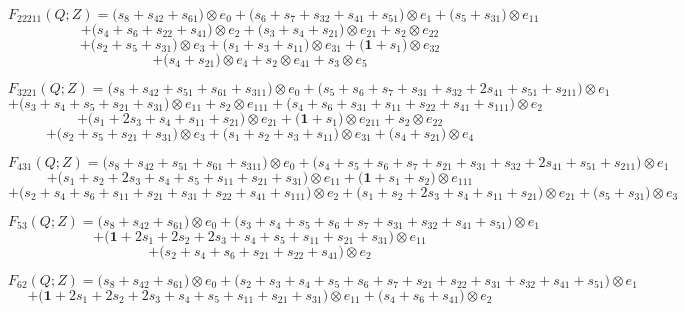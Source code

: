 \documentclass[12pt]{amsart}
\theoremstyle{plain}
\theoremstyle{definition}
\theoremstyle{remark}
\begin{document}
$$F_{ 22211 }(Q;Z)=
\big( s_{8} + s_{42} + s_{61} \big) \otimes e_{ 0 }
+\big( s_{6} + s_{7} + s_{32} + s_{41} + s_{51} \big) \otimes e_{ 1 }
+\big( s_{5} + s_{31} \big) \otimes e_{ 11 } $$ $$
+\big( s_{4} + s_{6} + s_{22} + s_{41} \big) \otimes e_{ 2 }
+\big( s_{3} + s_{4} + s_{21} \big) \otimes e_{ 21 }
+ s_{2} \otimes e_{ 22 } $$ $$
+\big( s_{2} + s_{5} + s_{31} \big) \otimes e_{ 3 }
+\big( s_{1} + s_{3} + s_{11} \big) \otimes e_{ 31 }
+\big( \boldsymbol{1} + s_{1} \big) \otimes e_{ 32 } $$ $$
+\big( s_{4} + s_{21} \big) \otimes e_{ 4 }
+ s_{2} \otimes e_{ 41 }
+ s_{3} \otimes e_{ 5 }
$$

\vfill\eject
$$F_{ 3221 }(Q;Z)=
\big( s_{8} + s_{42} + s_{51} + s_{61} + s_{311} \big) \otimes e_{ 0 }
+\big( s_{5} + s_{6} + s_{7} + s_{31} + s_{32} + 2 s_{41} + s_{51} + s_{211} \big) \otimes e_{ 1 } $$ $$
+\big( s_{3} + s_{4} + s_{5} + s_{21} + s_{31} \big) \otimes e_{ 11 } 
+ s_{2} \otimes e_{ 111 }
+\big( s_{4} + s_{6} + s_{31} + s_{11} + s_{22} + s_{41} + s_{111} \big) \otimes e_{ 2 } $$ $$
+\big( s_{1} + 2 s_{3} + s_{4} + s_{11} + s_{21} \big) \otimes e_{ 21 }
+\big( \boldsymbol{1} + s_{1} \big) \otimes e_{ 211 } 
+ s_{2} \otimes e_{ 22 } $$ $$
+\big( s_{2} + s_{5} + s_{21} + s_{31} \big) \otimes e_{ 3 }
+\big( s_{1} + s_{2} + s_{3} + s_{11} \big) \otimes e_{ 31 }
+\big( s_{4} + s_{21} \big) \otimes e_{ 4 }
$$

$$F_{ 431 }(Q;Z)=
\big( s_{8} + s_{42} + s_{51} + s_{61} + s_{311} \big) \otimes e_{ 0 }
+\big( s_{4} + s_{5} + s_{6} + s_{7} + s_{21} + s_{31} + s_{32} + 2 s_{41} + s_{51} + s_{211} \big) \otimes e_{ 1 } $$ $$
+\big( s_{1} + s_{2} + 2 s_{3} + s_{4} + s_{5} + s_{11} + s_{21} + s_{31} \big) \otimes e_{ 11 }
+\big( \boldsymbol{1} + s_{1} + s_{2} \big) \otimes e_{ 111 } $$ $$
+\big( s_{2} + s_{4} + s_{6} + s_{11} + s_{21} + s_{31} + s_{22} + s_{41} + s_{111} \big) \otimes e_{ 2 }
+\big( s_{1} + s_{2} + 2 s_{3} + s_{4} + s_{11} + s_{21} \big) \otimes e_{ 21 }
+\big( s_{5} + s_{31} \big) \otimes e_{ 3 }
$$

$$F_{ 53 }(Q;Z)=
\big( s_{8} + s_{42} + s_{61} \big) \otimes e_{ 0 }
+\big( s_{3} + s_{4} + s_{5} + s_{6} + s_{7} + s_{31} + s_{32} + s_{41} + s_{51} \big) \otimes e_{ 1 } $$ $$
+\big( \boldsymbol{1} + 2 s_{1} + 2 s_{2} + 2 s_{3} + s_{4} + s_{5} + s_{11} + s_{21} + s_{31} \big) \otimes e_{ 11 } $$ $$
+\big( s_{2} + s_{4} + s_{6} + s_{21} + s_{22} + s_{41} \big) \otimes e_{ 2 }
$$

$$F_{ 62 }(Q;Z)=
\big( s_{8} + s_{42} + s_{61} \big) \otimes e_{ 0 }
+\big( s_{2} + s_{3} + s_{4} + s_{5} + s_{6} + s_{7} + s_{21} + s_{22} + s_{31} + s_{32} + s_{41} + s_{51} \big) \otimes e_{ 1 } $$ $$
+\big( \boldsymbol{1} + 2 s_{1} + 2 s_{2} + 2 s_{3} + s_{4} + s_{5} + s_{11} + s_{21} + s_{31} \big) \otimes e_{ 11 }
+\big( s_{4} + s_{6} + s_{41} \big) \otimes e_{ 2 }
$$
\end{document}
